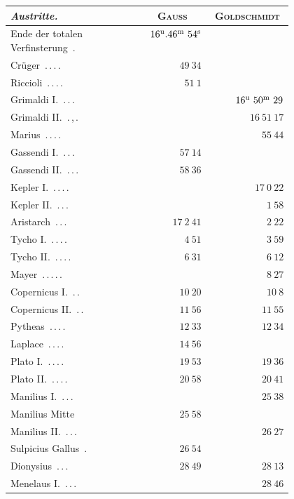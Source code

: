 \clearpage
\begin{center}\begingroup\fontsize{10}{12}\selectfont\setlength{\tabcolsep}{5pt}
\begin{tabular}{@{}p{0.47\linewidth}|r|r@{}}
\emph{Austritte.} & \multicolumn{1}{c|}{\textsc{Gauss}} & \multicolumn{1}{c}{\textsc{Goldschmidt}}\\\hline
Ende der totalen Verfinsterung\ \mbox{.} & $16^{\rm u}.46^{\rm m}\ 54^{\rm s}$ & \\
Crüger\ \mbox{.\,.\,.\,.} & $49\ 34$ & \\
Riccioli\ \mbox{.\,.\,.\,.} & $51\ 1$ & \\
Grimaldi I.\ \mbox{.\,.\,.} &  & $16^{\rm u}\ 50^{\rm m}\ 29$\\
Grimaldi II.\ \mbox{.\,,\,.} &  & $16\ 51\ 17$\\
Marius\ \mbox{.\,.\,.\,.} &  & $55\ 44$\\
Gassendi I.\ \mbox{.\,.\,.} & $57\ 14$ & \\
Gassendi II.\ \mbox{.\,.\,.} & $58\ 36$ & \\
Kepler I.\ \mbox{.\,.\,.\,.} &  & $17\ 0\ 22$\\
Kepler II.\ \mbox{.\,.\,.} &  & $1\ 58$\\
Aristarch\ \mbox{.\,.\,.} & $17\ 2\ 41$ & $2\ 22$\\
Tycho I.\ \mbox{.\,.\,.\,.} & $4\ 51$ & $3\ 59$\\
Tycho II.\ \mbox{.\,.\,.\,.} & $6\ 31$ & $6\ 12$\\
Mayer\ \mbox{.\,.\,.\,.\,.} &  & $8\ 27$\\
Copernicus I.\ \mbox{.\,.} & $10\ 20$ & $10\ 8$\\
Copernicus II.\ \mbox{.\,.} & $11\ 56$ & $11\ 55$\\
Pytheas\ \mbox{.\,.\,.\,.} & $12\ 33$ & $12\ 34$\\
Laplace\ \mbox{.\,.\,.\,.} & $14\ 56$ & \\
Plato I.\ \mbox{.\,.\,.\,.} & $19\ 53$ & $19\ 36$\\
Plato II.\ \mbox{.\,.\,.\,.} & $20\ 58$ & $20\ 41$\\
Manilius I.\ \mbox{.\,.\,.} &  & $25\ 38$\\
Manilius Mitte & $25\ 58$ & \\
Manilius II.\ \mbox{.\,.\,.} &  & $26\ 27$\\
Sulpicius Gallus\ \mbox{.} & $26\ 54$ & \\
Dionysius\ \mbox{.\,.\,.} & $28\ 49$ & $28\ 13$\\
Menelaus I.\ \mbox{.\,.\,.} &  & $28\ 46$\\

\end{tabular}
\end{center}
